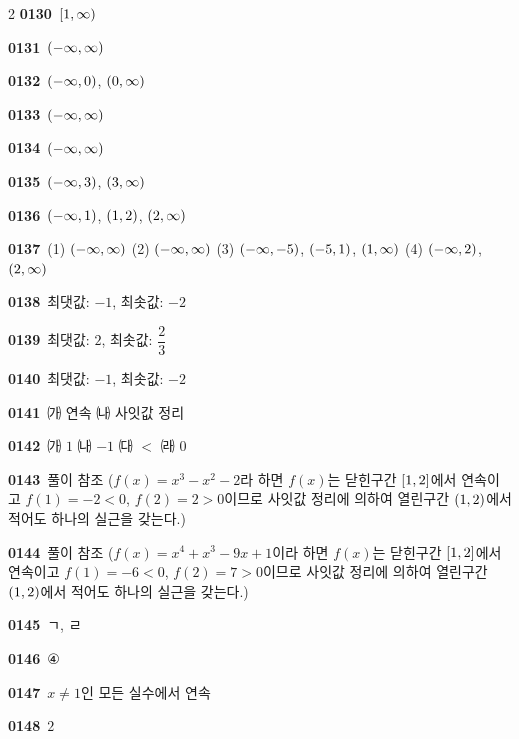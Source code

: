 \documentclass[10pt,a4paper]{article}
\begin{document}
\begin{multicols}{2}
\noindent\textbf{0130}\ $[1{,}\mkern3mu\mathopen{}\infty)$\par
\noindent\textbf{0131}\ $(-\infty{,}\mkern3mu\mathopen{}\infty)$\par
\noindent\textbf{0132}\ $(-\infty{,}\mkern3mu\mathopen{}0)$, $(0{,}\mkern3mu\mathopen{}\infty)$\par
\noindent\textbf{0133}\ $(-\infty{,}\mkern3mu\mathopen{}\infty)$\par
\noindent\textbf{0134}\ $(-\infty{,}\mkern3mu\mathopen{}\infty)$\par
\noindent\textbf{0135}\ $(-\infty{,}\mkern3mu\mathopen{}3)$, $(3{,}\mkern3mu\mathopen{}\infty)$\par
\noindent\textbf{0136}\ $(-\infty{,}\mkern3mu\mathopen{}1)$, $(1{,}\mkern3mu\mathopen{}2)$, $(2{,}\mkern3mu\mathopen{}\infty)$\par
\noindent\textbf{0137}\ (1) $(-\infty{,}\mkern3mu\mathopen{}\infty)$ \quad (2) $(-\infty{,}\mkern3mu\mathopen{}\infty)$ \quad (3) $(-\infty{,}\mkern3mu\mathopen{}-5)$, $(-5{,}\mkern3mu\mathopen{}1)$, $(1{,}\mkern3mu\mathopen{}\infty)$ \quad (4) $(-\infty{,}\mkern3mu\mathopen{}2)$, $(2{,}\mkern3mu\mathopen{}\infty)$\par
\noindent\textbf{0138}\ 최댓값: $-1$, 최솟값: $-2$\par
\noindent\textbf{0139}\ 최댓값: $2$, 최솟값: $\dfrac{2}{3}$\par
\noindent\textbf{0140}\ 최댓값: $-1$, 최솟값: $-2$\par
\noindent\textbf{0141}\ ㈎ 연속 \quad ㈏ 사잇값 정리\par
\noindent\textbf{0142}\ ㈎ $1$ \quad ㈏ $-1$ \quad ㈐ $<$ \quad ㈑ $0$\par
\noindent\textbf{0143}\ 풀이 참조 ($f(x)=x^3-x^2-2$라 하면 $f(x)$는 닫힌구간 $[1{,}\mkern3mu\mathopen{}2]$에서 연속이고 $f(1)=-2<0$, $f(2)=2>0$이므로 사잇값 정리에 의하여 열린구간 $(1{,}\mkern3mu\mathopen{}2)$에서 적어도 하나의 실근을 갖는다.)\par
\noindent\textbf{0144}\ 풀이 참조 ($f(x)=x^4+x^3-9x+1$이라 하면 $f(x)$는 닫힌구간 $[1{,}\mkern3mu\mathopen{}2]$에서 연속이고 $f(1)=-6<0$, $f(2)=7>0$이므로 사잇값 정리에 의하여 열린구간 $(1{,}\mkern3mu\mathopen{}2)$에서 적어도 하나의 실근을 갖는다.)\par
\noindent\textbf{0145}\ ㄱ, ㄹ\par
\noindent\textbf{0146}\ ④\par
\noindent\textbf{0147}\ $x\ne 1$인 모든 실수에서 연속\par
\noindent\textbf{0148}\ $2$\par

\end{multicols}
\end{document}
